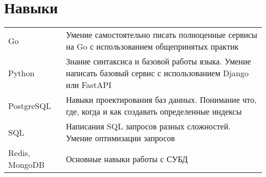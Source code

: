 \documentclass[a4paper,12pt]{article}
\begin{document}
\section{Навыки}
\begin{tabularx}{\linewidth}{@{}l X@{}}
Go &  \normalsize{Умение самостоятельно писать полноценные сервисы на Go с использованием общепринятых практик}\\
Python  &  \normalsize{Знание синтаксиса и базовой работы языка. Умение написать базовый сервис с использованием Django или FastAPI}\\  
PostgreSQL & \normalsize{Навыки проектирования баз данных. Понимание что, где, когда и как создавать определенные индексы} \\ 
SQL & \normalsize{Написания SQL запросов разных сложностей. Умение оптимизации запросов} \\
Redis, MongoDB & \normalsize{Основные навыки работы с СУБД}
\end{tabularx}

\vfill
{}
\end{document}
